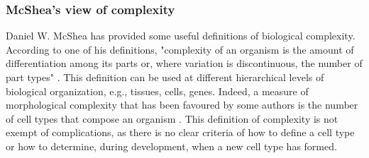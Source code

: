 %
%


\subsubsection{McShea's view of complexity}

Daniel W. McShea has provided some useful definitions of biological complexity. According to one of his definitions, "complexity of an organism is the amount of differentiation among its parts or, where variation is discontinuous, the number of part types" \citep{McShea1996,McShea2015}.
This definition can be used at different hierarchical levels of biological organization, e.g., tissues, cells, genes.
Indeed, a measure of morphological complexity that has been favoured by some authors 
is the number of cell types that compose an organism \citep{Valentine1994,Bell1997,Bonner2004}.
This definition of complexity is not exempt of complications, as there is no clear criteria of how to define a cell type or how to determine, during development, when a new cell type has formed.

